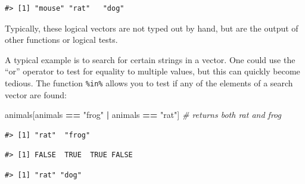 \documentclass[
]{book}
\newenvironment{Shaded}{\begin{snugshade}}{\end{snugshade}}
\newcommand{\CommentTok}[1]{\textcolor[rgb]{0.56,0.35,0.01}{\textit{#1}}}
\newcommand{\KeywordTok}[1]{\textcolor[rgb]{0.13,0.29,0.53}{\textbf{#1}}}
\newcommand{\NormalTok}[1]{#1}
\newcommand{\OperatorTok}[1]{\textcolor[rgb]{0.81,0.36,0.00}{\textbf{#1}}}
\newcommand{\StringTok}[1]{\textcolor[rgb]{0.31,0.60,0.02}{#1}}
\begin{document}
\begin{verbatim}
#> [1] "mouse" "rat"   "dog"
\end{verbatim}

Typically, these logical vectors are not typed out by hand, but are the output of
other functions or logical tests.

A typical example is to search for certain strings in a vector. One could use the
``or'' operator \texttt{\textbar{}} to test for equality to multiple values, but this can quickly
become tedious. The function \texttt{\%in\%} allows you to test if any of the elements of
a search vector are found:

\begin{Shaded}
\begin{Highlighting}[]
\NormalTok{animals[animals }\OperatorTok{==}\StringTok{ "frog"} \OperatorTok{|}\StringTok{ }\NormalTok{animals }\OperatorTok{==}\StringTok{ "rat"}\NormalTok{] }\CommentTok{# returns both rat and frog}
\end{Highlighting}
\end{Shaded}

\begin{verbatim}
#> [1] "rat"  "frog"
\end{verbatim}

\begin{Shaded}
\end{Shaded}

\begin{verbatim}
#> [1] FALSE  TRUE  TRUE FALSE
\end{verbatim}

\begin{Shaded}
\end{Shaded}

\begin{verbatim}
#> [1] "rat" "dog"
\end{verbatim}
\end{document}
